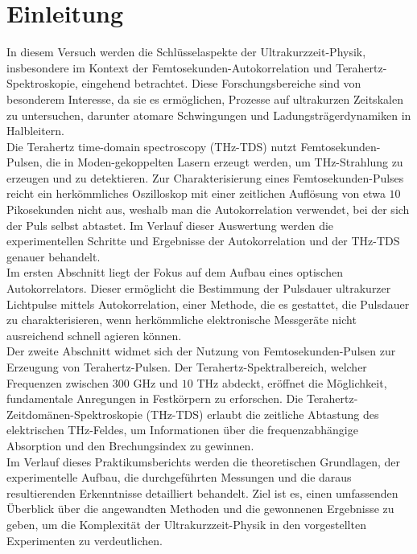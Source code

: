 \section{\label{sec:einleitung}Einleitung}
In diesem Versuch werden die Schlüsselaspekte der Ultrakurzzeit-Physik, 
insbesondere im Kontext der Femtosekunden-Autokorrelation und Terahertz-Spektroskopie, 
eingehend betrachtet. 
Diese Forschungsbereiche sind von besonderem Interesse, da sie es ermöglichen, 
Prozesse auf ultrakurzen Zeitskalen zu untersuchen, darunter atomare Schwingungen und 
Ladungsträgerdynamiken in Halbleitern. \\
Die Terahertz time-domain spectroscopy (THz-TDS) nutzt Femtosekunden-Pulsen, 
die in Moden-gekoppelten Lasern erzeugt werden, um THz-Strahlung zu erzeugen und zu detektieren.
Zur Charakterisierung eines Femtosekunden-Pulses reicht ein herkömmliches Oszilloskop mit einer zeitlichen Auflösung 
von etwa $10$ Pikosekunden nicht aus, weshalb man die Autokorrelation verwendet, bei der sich der Puls 
selbst abtastet. Im Verlauf dieser Auswertung werden die experimentellen Schritte und Ergebnisse 
der Autokorrelation und der THz-TDS genauer behandelt. \\
Im ersten Abschnitt liegt der Fokus auf dem Aufbau eines optischen Autokorrelators. 
Dieser ermöglicht die Bestimmung der Pulsdauer ultrakurzer Lichtpulse mittels Autokorrelation, 
einer Methode, die es gestattet, die Pulsdauer zu charakterisieren, wenn herkömmliche elektronische 
Messgeräte nicht ausreichend schnell agieren können. \\
Der zweite Abschnitt widmet sich der Nutzung von Femtosekunden-Pulsen zur Erzeugung von Terahertz-Pulsen. 
Der Terahertz-Spektralbereich, welcher Frequenzen zwischen $300$ GHz und $10$ THz abdeckt, 
eröffnet die Möglichkeit, fundamentale Anregungen in Festkörpern zu erforschen. 
Die Terahertz-Zeitdomänen-Spektroskopie (THz-TDS) erlaubt die zeitliche Abtastung des elektrischen 
THz-Feldes, um Informationen über die frequenzabhängige Absorption und den Brechungsindex zu gewinnen. \\
Im Verlauf dieses Praktikumsberichts werden die theoretischen Grundlagen, der experimentelle Aufbau, 
die durchgeführten Messungen und die daraus resultierenden Erkenntnisse detailliert behandelt. 
Ziel ist es, einen umfassenden Überblick über die angewandten Methoden und die gewonnenen Ergebnisse zu geben, 
um die Komplexität der Ultrakurzzeit-Physik in den vorgestellten Experimenten zu verdeutlichen.